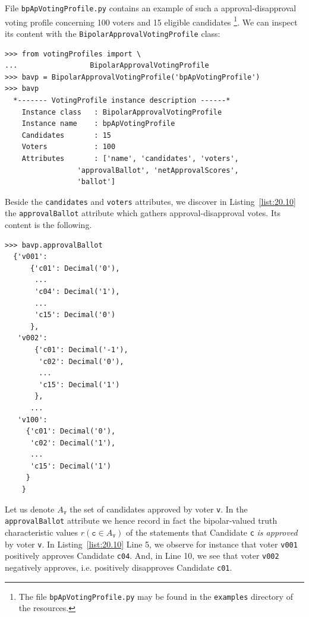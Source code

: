 File \texttt{bpApVotingProfile.py} contains an example of such a approval-disapproval voting profile concerning 100 voters and 15 eligible candidates \footnote{The file \texttt{bpApVotingProfile.py} may be found in the \texttt{examples} directory of the \Digraph resources.}. We can inspect its content with the \texttt{BipolarApprovalVotingProfile} class:
\begin{lstlisting}[caption={Bipolar approval voting profiles},label=list:20.9]
>>> from votingProfiles import \
...                 BipolarApprovalVotingProfile
>>> bavp = BipolarApprovalVotingProfile('bpApVotingProfile')
>>> bavp
  *------- VotingProfile instance description ------*
    Instance class   : BipolarApprovalVotingProfile
    Instance name    : bpApVotingProfile
    Candidates       : 15
    Voters           : 100
    Attributes       : ['name', 'candidates', 'voters',
                 'approvalBallot', 'netApprovalScores',
                 'ballot']
\end{lstlisting}

Beside the \texttt{candidates} and \texttt{voters} attributes, we discover in Listing~\vref{list:20.10} the \texttt{approvalBallot} attribute which gathers approval-disapproval votes. Its content is the following.
\begin{lstlisting}[caption={Inspecting an approval-disapproval ballot},label=list:20.10]
>>> bavp.approvalBallot
  {'v001':
      {'c01': Decimal('0'),
       ...
       'c04': Decimal('1'),
       ...
       'c15': Decimal('0')
      },
   'v002':
       {'c01': Decimal('-1'),
        'c02': Decimal('0'),
        ...
        'c15': Decimal('1')
       },
      ...
   'v100':
     {'c01': Decimal('0'),
      'c02': Decimal('1'),
      ...
      'c15': Decimal('1')
     }
    }
\end{lstlisting}	

Let us denote $A_{\mathtt{v}}$ the set of candidates approved by voter \texttt{v}. In the \texttt{approval\-Ballot} attribute we hence record in fact the bipolar-valued truth characteristic values $r(\mathtt{c} \in A_{\mathtt{v}})$ of the statements that Candidate \texttt{c} \emph{is approved} by voter \texttt{v}. In Listing~\vref{list:20.10} Line 5, we observe for instance that voter \texttt{v001} positively approves Candidate \texttt{c04}. And, in Line 10, we see that voter \texttt{v002} negatively approves, i.e. positively disapproves Candidate \texttt{c01}.


